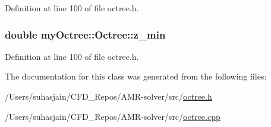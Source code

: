 Definition at line 100 of file octree.\+h.

\hypertarget{classmy_octree_1_1_octree_a8681e21690dc7dabb18c2b3541e20817}{}
\subsubsection[{z\+\_\+min}]{\setlength{\rightskip}{0pt plus 5cm}double my\+Octree\+::\+Octree\+::z\+\_\+min}\label{classmy_octree_1_1_octree_a8681e21690dc7dabb18c2b3541e20817}


Definition at line 100 of file octree.\+h.



The documentation for this class was generated from the following files\+:\begin{DoxyCompactItemize}
\item 
/\+Users/suhasjain/\+C\+F\+D\+\_\+\+Repos/\+A\+M\+R-\/solver/src/\hyperlink{octree_8h}{octree.\+h}\item 
/\+Users/suhasjain/\+C\+F\+D\+\_\+\+Repos/\+A\+M\+R-\/solver/src/\hyperlink{octree_8cpp}{octree.\+cpp}\end{DoxyCompactItemize}
